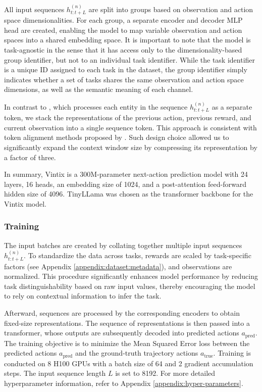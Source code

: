 \documentclass{article}
\theoremstyle{plain}
\theoremstyle{definition}
\theoremstyle{remark}
\begin{document}
All input sequences $h_{t:t+L}^{(n)}$ are split into groups based on observation and action space dimensionalities. For each group, a separate encoder and decoder MLP head are created, enabling the model to map variable observation and action spaces into a shared embedding space. It is important to note that the model is task-agnostic in the sense that it has access only to the dimensionality-based group identifier, but not to an individual task identifier. While the task identifier is a unique ID assigned to each task in the dataset, the group identifier simply indicates whether a set of tasks shares the same observation and action space dimensions, as well as the semantic meaning of each channel.

In contrast to \citet{laskin2022incontextreinforcementlearningalgorithm}, which processes each entity in the sequence $h_{t:t+L}^{(n)}$ as a separate token, we stack the representations of the previous action, previous reward, and current observation into a single sequence token. This approach is consistent with token alignment methods proposed by \citet{DBLP:journals/corr/DuanSCBSA16, grigsby2024amagoscalableincontextreinforcement, grigsby2024amago2breakingmultitaskbarrier}. Such design choice allowed us to significantly expand the context window size by compressing its representation by a factor of three.

In summary, Vintix is a 300M-parameter next-action prediction model with 24 layers, 16 heads, an embedding size of 1024, and a post-attention feed-forward hidden size of 4096. TinyLLama \cite{zhang2024tinyllama} was chosen as the transformer backbone for the Vintix model.

\subsubsection{Training}
The input batches are created by collating together multiple input sequences $h_{t:t+L}^{(n)}$. To standardize the data across tasks, rewards are scaled by task-specific factors (see Appendix \ref{appendix:dataset:metadata}), and observations are normalized. This procedure significantly enhances model performance by reducing task distinguishability based on raw input values, thereby encouraging the model to rely on contextual information to infer the task.

Afterward, sequences are processed by the corresponding encoders to obtain fixed-size representations. The sequence of representations is then passed into a transformer, whose outputs are subsequently decoded into predicted actions \( a_{\text{pred}} \). The training objective is to minimize the Mean Squared Error loss between the predicted actions \( a_{\text{pred}} \) and the ground-truth trajectory actions \( a_{\text{true}} \). Training is conducted on 8 H100 GPUs with a batch size of 64 and 2 gradient accumulation steps. The input sequence length \( L \) is set to 8192.  For more detailed hyperparameter information, refer to Appendix \ref{appendix:hyper-parameters}.
\end{document}
